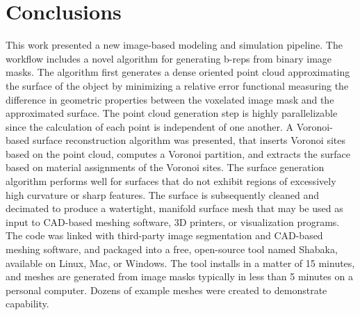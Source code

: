 \chapter{Conclusions}
\label{chap:7}
%

This work presented a new image-based modeling and simulation pipeline. The workflow includes a novel algorithm for generating b-reps from binary image masks. The algorithm first generates a dense oriented point cloud approximating the surface of the object by minimizing a relative error functional measuring the difference in geometric properties between the voxelated image mask and the approximated surface. The point cloud generation step is highly parallelizable since the calculation of each point is independent of one another. A Voronoi-based surface reconstruction algorithm was presented, that inserts Voronoi sites based on the point cloud, computes a Voronoi partition, and extracts the surface based on material assignments of the Voronoi sites. The surface generation algorithm performs well for surfaces that do not exhibit regions of excessively high curvature or sharp features. The surface is subsequently cleaned and decimated to produce a watertight, manifold surface mesh that may be used as input to CAD-based meshing software, 3D printers, or visualization programs. The code was linked with third-party image segmentation and CAD-based meshing software, and packaged into a free, open-source tool named Shabaka, available on Linux, Mac, or Windows. The tool installs in a matter of 15 minutes, and meshes are generated from image masks typically in less than 5 minutes on a personal computer. Dozens of example meshes were created to demonstrate capability.

